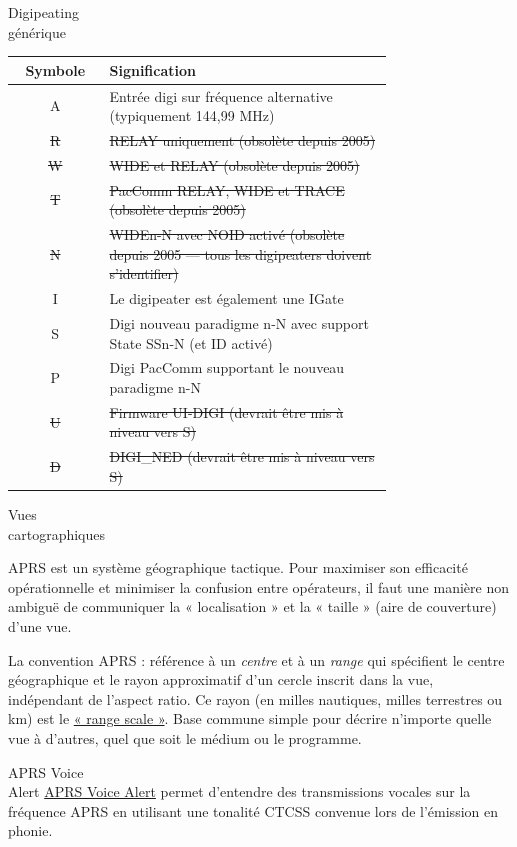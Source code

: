 \begin{aprssideblock}{Digipeating\\générique}
\begin{samepage}
\begin{center}
{\small
\setlength{\tabcolsep}{4pt}
\renewcommand{\arraystretch}{1.2}
\begin{tabular}{|c|p{0.75\linewidth}|}
\hhline{|-|-|}
\rowcolor{gray!20}
\bfseries Symbole & \bfseries Signification \\
\hline
A & Entrée digi sur fréquence alternative (typiquement 144,99 MHz) \\
\hline
\sout{R} & \sout{RELAY uniquement (obsolète depuis 2005)} \\
\hline
\sout{W} & \sout{WIDE et RELAY (obsolète depuis 2005)} \\
\hline
\sout{T} & \sout{PacComm RELAY, WIDE et TRACE (obsolète depuis 2005)} \\
\hline
\sout{N} & \sout{WIDEn-N avec NOID activé (obsolète depuis 2005 --- tous les
    digipeaters doivent s'identifier)} \\
\hline
I & Le digipeater est également une IGate \\
\hline
S & Digi nouveau paradigme n-N avec support State SSn-N (et ID activé) \\
\hline
P & Digi PacComm supportant le nouveau paradigme n-N \\
\hline
\sout{U} & \sout{Firmware UI-DIGI (devrait être mis à niveau vers S)} \\
\hline
\sout{D} & \sout{DIGI\_NED (devrait être mis à niveau vers S)} \\
\hline
\end{tabular}
}
\end{center}
\end{samepage}
\end{aprssideblock}

\begin{aprssideblock}{Vues\\cartographiques}
\label{communiquer-des-vues-cartographiques-sans-ambiguuxeftuxe9}
APRS est un système géographique tactique. Pour maximiser son efficacité
opérationnelle et minimiser la confusion entre opérateurs, il faut une
manière non ambiguë de communiquer la « localisation » et la « taille »
(aire de couverture) d'une vue.

La convention APRS : référence à un \emph{centre} et à un \emph{range}
qui spécifient le centre géographique et le rayon approximatif d'un
cercle inscrit dans la vue, indépendant de l'aspect ratio. Ce rayon (en
milles nautiques, milles terrestres ou km) est le
\href{http://www.aprs.org/aprs11/RangeScale.txt}{« range scale »}. Base
commune simple pour décrire n'importe quelle vue à d'autres, quel que
soit le médium ou le programme.
\end{aprssideblock}

\begin{aprssideblock}{APRS Voice\\Alert}
\href{http://www.aprs.org/VoiceAlert3.html}{APRS Voice Alert} permet
d'entendre des transmissions vocales sur la
fréquence APRS en utilisant une tonalité CTCSS convenue lors de
l'émission en phonie.
\end{aprssideblock}
